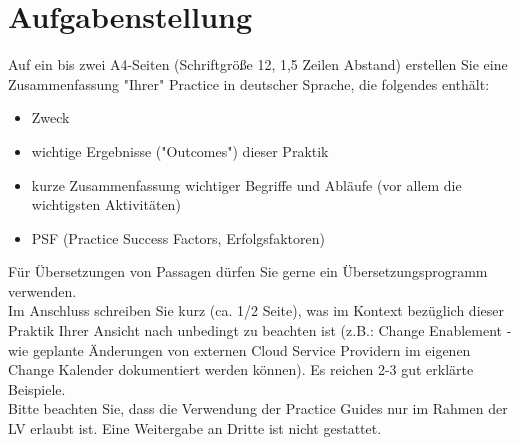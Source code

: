 \section{Aufgabenstellung}
Auf ein bis zwei A4-Seiten (Schriftgröße 12, 1,5 Zeilen Abstand) erstellen Sie eine Zusammenfassung "Ihrer" Practice in deutscher Sprache, die folgendes enthält: 

\begin{itemize}
	\item Zweck
	\item wichtige Ergebnisse ("Outcomes") dieser Praktik 
	\item kurze Zusammenfassung wichtiger Begriffe und Abläufe (vor allem die wichtigsten Aktivitäten)
	\item PSF (Practice Success Factors, Erfolgsfaktoren)
\end{itemize}

\noindent
Für Übersetzungen von Passagen dürfen Sie gerne ein Übersetzungsprogramm verwenden. \\

\noindent
Im Anschluss schreiben Sie kurz (ca. 1/2 Seite), was im Kontext bezüglich dieser Praktik Ihrer Ansicht nach unbedingt zu beachten ist (z.B.: Change Enablement - wie geplante Änderungen von externen Cloud Service Providern im eigenen Change Kalender dokumentiert werden können). Es reichen 2-3 gut erklärte Beispiele. \\

\noindent
Bitte beachten Sie, dass die Verwendung der Practice Guides nur im Rahmen der LV erlaubt ist. Eine Weitergabe an Dritte ist nicht gestattet. 

